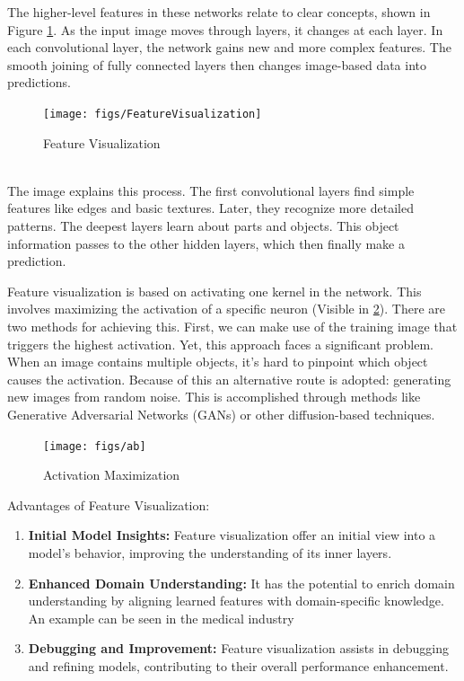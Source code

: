 The higher-level features in these networks relate to clear concepts, shown in Figure \ref{fig:feature-visualization}. As the input image moves through layers, it changes at each layer. In each convolutional layer, the network gains new and more complex features. The smooth joining of fully connected layers then changes image-based data into predictions.
\\
\begin{figure}[h!]
	\centering
	\texttt{[image: figs/FeatureVisualization]}
	\caption{Feature Visualization \cite{olah2017feature}}
	\label{fig:feature-visualization}
\end{figure}
\\
The image explains this process. The first convolutional layers find simple features like edges and basic textures. Later, they recognize more detailed patterns. The deepest layers learn about parts and objects. This object information passes to the other hidden layers, which then finally make a prediction.

Feature visualization is based on activating one kernel in the network. This involves maximizing the activation of a specific neuron (Visible in \ref*{fig:optimization}). There are two methods for achieving this. First, we can make use of the training image that triggers the highest activation. Yet, this approach faces a significant problem. When an image contains multiple objects, it's hard to pinpoint which object causes the activation. Because of this an alternative route is adopted: generating new images from random noise. This is accomplished through methods like Generative Adversarial Networks (GANs) or other diffusion-based techniques.

\begin{figure}[h!]
	\centering
	\texttt{[image: figs/ab]}
	\caption{Activation Maximization \cite{olah2017feature}}
	\label{fig:optimization}
\end{figure}

Advantages of Feature Visualization:
\begin{enumerate}
	\item \textbf{Initial Model Insights:} Feature visualization offer an initial view into a model's behavior, improving the understanding of its inner layers.
	\item \textbf{Enhanced Domain Understanding:} It has the potential to enrich domain understanding by aligning learned features with domain-specific knowledge. An example can be seen in the medical industry
	\item \textbf{Debugging and Improvement:} Feature visualization assists in debugging and refining models, contributing to their overall performance enhancement.
\end{enumerate}

